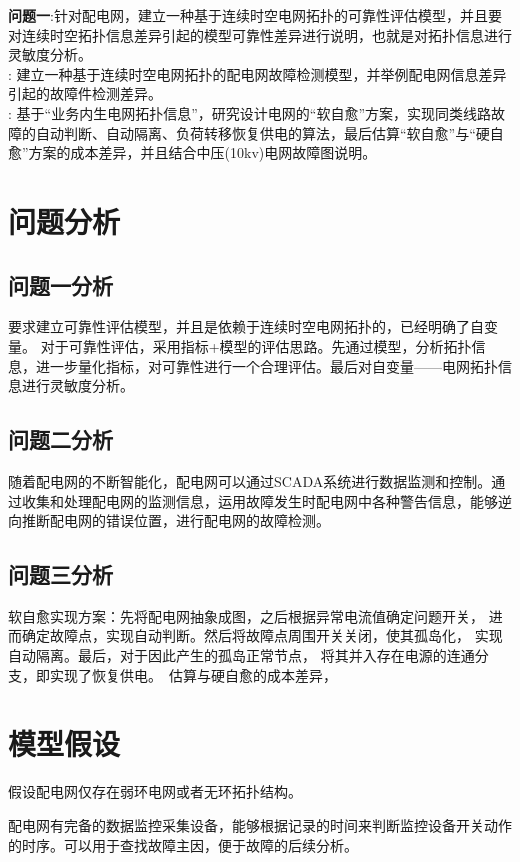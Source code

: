 \documentclass[withoutpreface,bwprint]{cumcmthesis} %
\begin{document}
{\bf 问题一}:针对配电网，建立一种基于连续时空电网拓扑的可靠性评估模型，并且要对连续时空拓扑信息差异引起的模型可靠性差异进行说明，也就是对拓扑信息进行灵敏度分析。\\
: 建立一种基于连续时空电网拓扑的配电网故障检测模型，并举例配电网信息差异引起的故障件检测差异。\\
: 基于“业务内生电网拓扑信息”，研究设计电网的“软自愈”方案，实现同类线路故障的自动判断、自动隔离、负荷转移恢复供电的算法，最后估算“软自愈”与“硬自愈”方案的成本差异，并且结合中压(10kv)电网故障图说明。

\section{问题分析}
\subsection{问题一分析}
要求建立可靠性评估模型，并且是依赖于连续时空电网拓扑的，已经明确了自变量。 对于可靠性评估，采用指标+模型的评估思路。先通过模型，分析拓扑信息，进一步量化指标，对可靠性进行一个合理评估。最后对自变量——电网拓扑信息进行灵敏度分析。

\subsection{问题二分析}
随着配电网的不断智能化，配电网可以通过SCADA系统\cite{yy5}进行数据监测和控制。通过收集和处理配电网的监测信息，运用故障发生时配电网中各种警告信息，能够逆向推断配电网的错误位置，进行配电网的故障检测。
\subsection{问题三分析}
软自愈实现方案：先将配电网抽象成图，之后根据异常电流值确定问题开关，
进而确定故障点，实现自动判断。然后将故障点周围开关关闭，使其孤岛化，
实现自动隔离。最后，对于因此产生的孤岛正常节点，
将其并入存在电源的连通分支，即实现了恢复供电。\, 估算与硬自愈的成本差异，


\section{模型假设}
\begin{assumption}
    假设配电网仅存在弱环电网或者无环拓扑结构。
\end{assumption}

\begin{assumption}
    配电网有完备的数据监控采集设备，能够根据记录的时间来判断监控设备开关动作的时序。可以用于查找故障主因，便于故障的后续分析。
\end{assumption}
\end{document}
